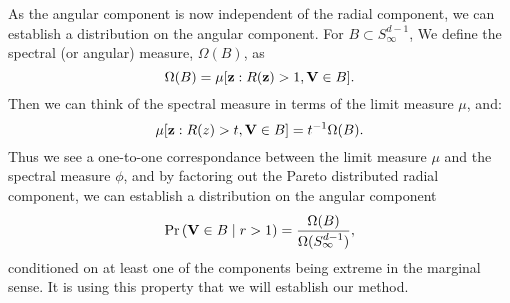 As the angular component is now independent of the radial component, we can
  establish a distribution on the angular component.  For
  $B\subset S_{\infty}^{d-1}$, We define the spectral (or angular) measure,
  $\Omega(B)$, as
  \begin{equation}
    \Omega(B) = \mu[{\bf z}: R({\bf z}) > 1, {\bf V} \in B].
  \end{equation}
  Then we can think of the spectral measure in terms of the limit measure $\mu$, and:
  \begin{equation}
    \mu[{\bf z}:R(z)>t, {\bf V}\in B] = t^{-1}\Omega(B).
  \end{equation}
  Thus we see a one-to-one correspondance between the limit measure $\mu$ and the
    spectral measure $\phi$, and by factoring out the Pareto distributed radial
    component, we can establish a distribution on the angular component
  \begin{equation}
    \text{Pr}\left({\bf V} \in B \mid r > 1\right) = \frac{\Omega(B)}{\Omega(S_{\infty}^{d-1})},
  \end{equation}
  conditioned on at least one of the components being extreme in the marginal
    sense.  It is using this property that we will establish our method.

